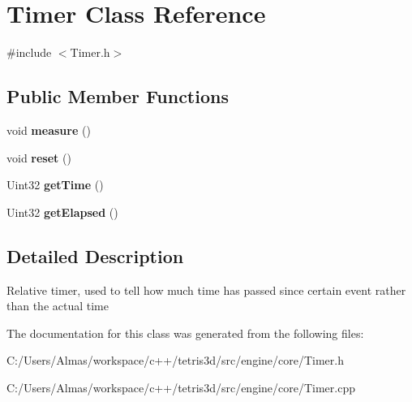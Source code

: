 \hypertarget{class_timer}{\section{Timer Class Reference}
\label{class_timer}
}


{\ttfamily \#include $<$Timer.\-h$>$}

\subsection*{Public Member Functions}
\begin{DoxyCompactItemize}
\item 
\hypertarget{class_timer_a564a3ad5837a609fce4f33b45f51bb2a}{void {\bfseries measure} ()}\label{class_timer_a564a3ad5837a609fce4f33b45f51bb2a}

\item 
\hypertarget{class_timer_a9020542d73357a4eef512eefaf57524b}{void {\bfseries reset} ()}\label{class_timer_a9020542d73357a4eef512eefaf57524b}

\item 
\hypertarget{class_timer_a62bbc2379bbe5aac86ae2609d2db1437}{Uint32 {\bfseries get\-Time} ()}\label{class_timer_a62bbc2379bbe5aac86ae2609d2db1437}

\item 
\hypertarget{class_timer_aa2460065d1e157cbac0e72282d6f1c95}{Uint32 {\bfseries get\-Elapsed} ()}\label{class_timer_aa2460065d1e157cbac0e72282d6f1c95}

\end{DoxyCompactItemize}


\subsection{Detailed Description}
Relative timer, used to tell how much time has passed since certain event rather than the actual time 

The documentation for this class was generated from the following files\-:\begin{DoxyCompactItemize}
\item 
C\-:/\-Users/\-Almas/workspace/c++/tetris3d/src/engine/core/Timer.\-h\item 
C\-:/\-Users/\-Almas/workspace/c++/tetris3d/src/engine/core/Timer.\-cpp\end{DoxyCompactItemize}
